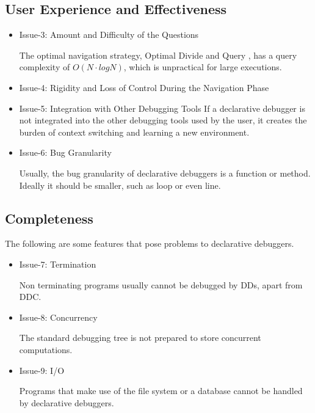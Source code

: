 \subsection{User Experience and Effectiveness}
\begin{itemize}
    \item Issue-3: Amount and Difficulty of the Questions

The optimal navigation strategy, Optimal Divide and Query \cite{optimal_strategy}, has a query complexity of \(O(N\cdot log N)\), which is unpractical for large executions.
    \item Issue-4: Rigidity and Loss of Control During the Navigation Phase
    \item Issue-5: Integration with Other Debugging Tools
If a declarative debugger is not integrated into the other debugging tools used by the user, it creates the burden of context switching and learning a new environment.
    \item Issue-6: Bug Granularity 

Usually, the bug granularity of declarative debuggers is a function or method. Ideally it should be smaller, such as loop or even line.
\end{itemize}
\subsection{Completeness}
The following are some features that pose problems to declarative debuggers.
\begin{itemize}
    \item Issue-7: Termination

Non terminating programs usually cannot be debugged by DDs, apart from DDC.
    \item Issue-8: Concurrency

The standard debugging tree is not prepared to store concurrent computations.
    \item Issue-9: I/O

Programs that make use of the file system or a database cannot be handled by declarative debuggers.
\end{itemize}
